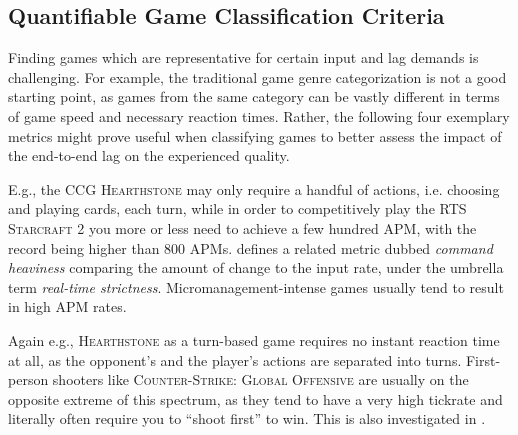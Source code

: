 


\subsection{Quantifiable Game Classification Criteria}


Finding games which are representative for certain input and lag demands is challenging.
For example, the traditional game genre categorization is not a good starting point, as games from the same category can be vastly different in terms of game speed and necessary reaction times.
Rather, the following four exemplary metrics might prove useful when classifying games to better assess the impact of the end-to-end lag on the experienced quality.

 E.g., the \gls{CCG} \textsc{Hearthstone} may only require a handful of actions, i.e. choosing and playing cards, each turn, while in order to competitively play the \gls{RTS} \textsc{Starcraft 2} you more or less need to achieve a few hundred \gls{APM}, with the record being higher than $800$ \glspl{APM}. \cite{6404025} defines a related metric dubbed \textit{command heaviness} comparing the amount of change to the input rate, under the umbrella term \textit{real-time strictness}. %
    Micromanagement-intense games usually tend to result in high APM rates.

 Again e.g., \textsc{Hearthstone} as a turn-based game requires no instant reaction time at all, as the opponent's and the player's actions are separated into turns. First-person shooters like \textsc{Counter-Strike: Global Offensive} are usually on the opposite extreme of this spectrum, as they tend to have a very high tickrate and literally often require you to ``shoot first'' to win. This is also investigated in \cite{Claypool:2006:LPA:1167838.1167860}.


